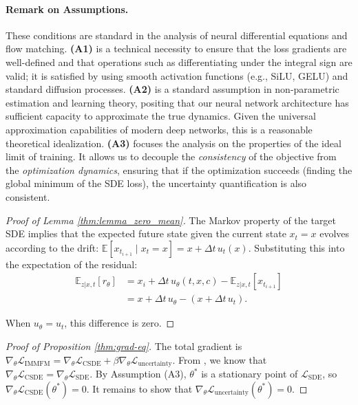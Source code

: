 \documentclass[twoside]{article}
\begin{document}
{{\paragraph{Remark on Assumptions.}
These conditions are standard in the analysis of neural differential equations and flow matching.
\textbf{(A1)} is a technical necessity to ensure that the loss gradients are well-defined and that operations such as differentiating under the integral sign are valid; it is satisfied by using smooth activation functions (e.g., SiLU, GELU) and standard diffusion processes.
\textbf{(A2)} is a standard assumption in non-parametric estimation and learning theory, positing that our neural network architecture has sufficient capacity to approximate the true dynamics. Given the universal approximation capabilities of modern deep networks, this is a reasonable theoretical idealization.
\textbf{(A3)} focuses the analysis on the properties of the ideal limit of training. It allows us to decouple the \emph{consistency} of the objective from the \emph{optimization dynamics}, ensuring that if the optimization succeeds (finding the global minimum of the SDE loss), the uncertainty quantification is also consistent.

\begin{proof}[Proof of Lemma \ref{thm:lemma_zero_mean}]
The Markov property of the target SDE implies that the expected future state given the current state $x_t=x$ evolves according to the drift: $\mathbb E[x_{t_{i+1}}\mid x_t=x]=x+\Delta t\,u_t(x)$.
Substituting this into the expectation of the residual:
\begin{align}
   \mathbb{E}_{z|x,t}[r_\theta] &= x_i + \Delta t\,u_\theta(t,x,c) - \mathbb{E}_{z|x,t}[x_{t_{i+1}}]\\ &= x + \Delta t\,u_\theta - (x + \Delta t\,u_t). 
\end{align}


When $u_\theta = u_t$, this difference is zero.
\end{proof}

\begin{proof}[Proof of Proposition \ref{thm:grad-eq}]
The total gradient is $\nabla_\theta \mathcal{L}_{\text{IMMFM}} = \nabla_\theta \mathcal{L}_{\text{CSDE}} + \beta \nabla_\theta \mathcal{L}_{\text{uncertainty}}$.
From \citep[Thm 3.2]{tong2023simulation}, we know that $\nabla_\theta \mathcal{L}_{\text{CSDE}} = \nabla_\theta \mathcal{L}_{\text{SDE}}$.
By Assumption (A3), $\theta^*$ is a stationary point of $\mathcal{L}_{\text{SDE}}$, so $\nabla_\theta \mathcal{L}_{\text{CSDE}}(\theta^*) = 0$.
It remains to show that $\nabla_\theta \mathcal{L}_{\text{uncertainty}}(\theta^*) = 0$.


\end{proof}}}
\end{document}
